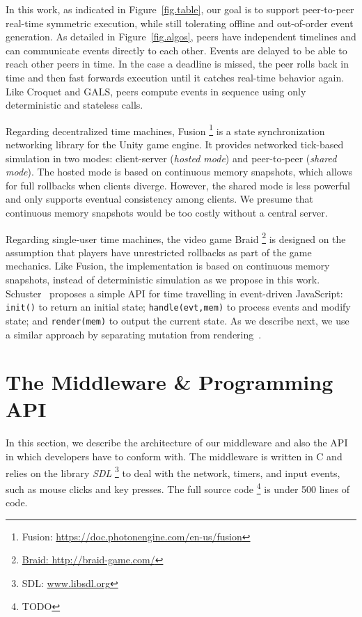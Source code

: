 \documentclass[10pt,journal,compsoc]{IEEEtran}
\newcommand{\code}[1]  {\texttt{\footnotesize{#1}}}
\begin{document}
In this work, as indicated in Figure~\ref{fig.table}, our goal is to support
peer-to-peer real-time symmetric execution, while still tolerating offline and
out-of-order event generation.
%
As detailed in Figure~\ref{fig.algos}, peers have independent timelines and
can communicate events directly to each other.
Events are delayed to be able to reach other peers in time.
In the case a deadline is missed, the peer rolls back in time and then fast
forwards execution until it catches real-time behavior again.
%
Like Croquet and GALS, peers compute events in sequence using only
deterministic and stateless calls.

Regarding decentralized time machines, Fusion%
\footnote{Fusion: \url{https://doc.photonengine.com/en-us/fusion}}
is a state synchronization networking library for the Unity game engine.
It provides networked tick-based simulation in two modes: client-server
(\emph{hosted mode}) and peer-to-peer (\emph{shared mode}).
The hosted mode is based on continuous memory snapshots, which allows for
full rollbacks when clients diverge.
However, the shared mode is less powerful and only supports eventual
consistency among clients.
We presume that continuous memory snapshots would be too costly without a
central server.

Regarding single-user time machines, the video game Braid%
\footnote{\url{Braid: http://braid-game.com/}}
is designed on the assumption that players have unrestricted rollbacks as part
of the game mechanics.
Like Fusion, the implementation is based on continuous memory snapshots,
instead of deterministic simulation as we propose in this work.
%
Schuster~\cite{tml.js} proposes a simple API for time travelling in
event-driven JavaScript:
    \code{init()} to return an initial state;
    \code{handle(evt,mem)} to process events and modify state; and
    \code{render(mem)} to output the current state.
As we describe next, we use a similar approach by separating mutation from
rendering~\cite{tml.alive}.

\section{The Middleware \& Programming API}
\label{sec.tml}

In this section, we describe the architecture of our middleware and also the
API in which developers have to conform with.
%
The middleware is written in C and relies on the library \emph{SDL}%
\footnote{SDL: \url{www.libsdl.org}}
to deal with the network, timers, and input events, such as mouse clicks and
key presses.
The full source code%
\footnote{TODO}
is under 500 lines of code.
\end{document}
